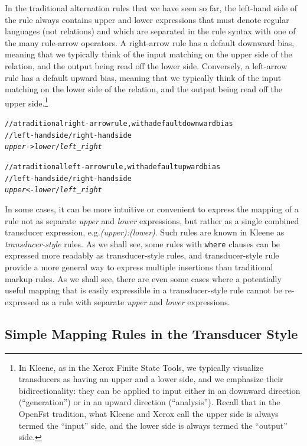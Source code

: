 In the traditional alternation rules that we have seen so far, the left-hand side of the rule always
contains upper and lower expressions that must denote regular languages (not relations) and which are
separated in the rule syntax with one of the many rule-arrow operators.  A right-arrow rule has a
default downward bias, meaning that we typically think of the input matching on the upper side of the
relation, and the output being read off the lower side.  Conversely, a left-arrow rule has a default
upward bias, meaning that we typically think of the input matching on the lower side of the relation,
and the output being read off the upper side.\footnote{In Kleene, as in the Xerox Finite State Tools, we
	typically visualize transducers as having an upper and a lower side, and we emphasize their
	bidirectionality: they can be applied to input either in an downward direction (``generation'')
	or in an upward direction (``analysis'').  Recall that in the OpenFst tradition, what Kleene and
	Xerox call the upper side is always termed the ``input'' side, and the lower side is always termed
the ``output'' side.}

\begin{alltt}
	// a traditional right-arrow rule, with a default downward bias
// left-hand side / right-hand side
\emph{upper} -> \emph{lower} / \emph{left} _ \emph{right}

// a traditional left-arrow rule, with a default upward bias
// left-hand side / right-hand side
\emph{upper} <- \emph{lower} / \emph{left} _ \emph{right}
\end{alltt}

In some cases, it can be more intuitive or convenient to express the mapping of a rule not as 
separate \emph{upper}
and \emph{lower} expressions, but rather as a single combined transducer expression,
e.g.\@ \emph{(upper):(lower)}.
Such rules are known in Kleene as \emph{transducer-style} rules.  As we shall see, some rules with
\texttt{where} clauses can be expressed more readably as transducer-style rules, and transducer-style rule provide a more
general way to express multiple insertions than traditional markup rules.  As we shall see, there are even
some cases where a potentially useful mapping that is easily expressible in a transducer-style rule cannot be re-expressed as a rule
with separate \emph{upper} and \emph{lower} expressions.

\subsection{Simple Mapping Rules in the Transducer Style}

